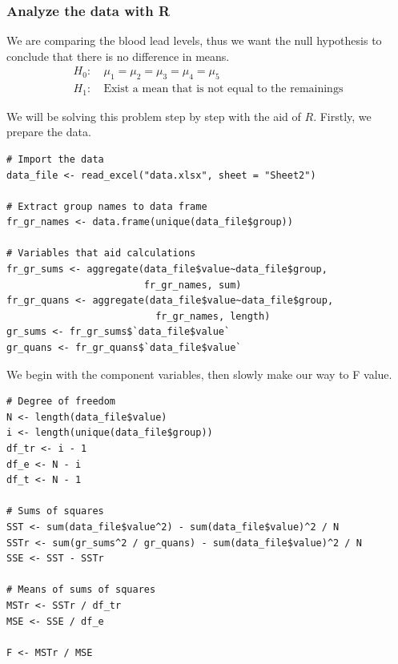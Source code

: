 \documentclass[a4paper]{article}
\numberwithin{equation}{section}
\begin{document}
\subsubsection{Analyze the data with R}
We are comparing the blood lead levels, thus we want the null hypothesis to conclude that there is no difference in means.
\begin{align*}
  H_0: & \ \mu_1 = \mu_2 = \mu_3 = \mu_4 = \mu_5                   \\
  H_1: & \ \text{Exist a mean that is not equal to the remainings}
\end{align*}

We will be solving this problem step by step with the aid of \(R\).
Firstly, we prepare the data.
\begin{mdframed}[leftline=false,rightline=false,backgroundcolor=magenta!10,nobreak=true]
  \begin{verbatim}
# Import the data
data_file <- read_excel("data.xlsx", sheet = "Sheet2")

# Extract group names to data frame
fr_gr_names <- data.frame(unique(data_file$group))

# Variables that aid calculations
fr_gr_sums <- aggregate(data_file$value~data_file$group,
                        fr_gr_names, sum)
fr_gr_quans <- aggregate(data_file$value~data_file$group,
                          fr_gr_names, length)
gr_sums <- fr_gr_sums$`data_file$value`
gr_quans <- fr_gr_quans$`data_file$value`
  \end{verbatim}
\end{mdframed}

We begin with the component variables, then slowly make our way to F value.
\begin{mdframed}[leftline=false,rightline=false,backgroundcolor=magenta!10,nobreak=true]
  \begin{verbatim}
# Degree of freedom
N <- length(data_file$value)
i <- length(unique(data_file$group))
df_tr <- i - 1
df_e <- N - i
df_t <- N - 1

# Sums of squares
SST <- sum(data_file$value^2) - sum(data_file$value)^2 / N
SSTr <- sum(gr_sums^2 / gr_quans) - sum(data_file$value)^2 / N
SSE <- SST - SSTr

# Means of sums of squares
MSTr <- SSTr / df_tr
MSE <- SSE / df_e

F <- MSTr / MSE
  \end{verbatim}
\end{mdframed}
\end{document}
